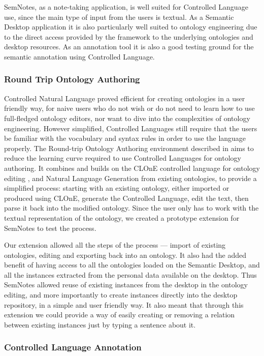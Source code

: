 SemNotes, as a note-taking application, is well suited for Controlled Language use, since the main type of input from the users is textual. As a Semantic Desktop application it is also particularly well suited to ontology engineering due to the direct access provided by the framework to the underlying ontologies and desktop resources. As an annotation tool it is also a good testing ground for the semantic annotation using Controlled Language.

\subsubsection{Round Trip Ontology Authoring}

Controlled Natural Language proved efficient for creating ontologies in a user friendly way, for naive users who do not wish or do not need to learn how to use full-fledged ontology editors, nor want to dive into the complexities of ontology engineering. However simplified, Controlled Languages still require that the users be familiar with the vocabulary and syntax rules in order to use the language properly. The Round-trip Ontology Authoring environment described in \cite{Davis2008} aims to reduce the learning curve required to use Controlled Languages for ontology authoring. It combines and builds on the CLOnE controlled language for ontology editing \cite{Funk2007}, and Natural Language Generation from existing ontologies, to provide a simplified process: starting with an existing ontology, either imported or produced using CLOnE, generate the Controlled Language, edit the text, then parse it back into the modified ontology. Since the user only has to work with the textual representation of the ontology, we created a prototype extension for SemNotes to test the process.

Our extension allowed all the steps of the process --- import of existing ontologies, editing and exporting back into an ontology. It also had the added benefit of having access to all the ontologies loaded on the Semantic Desktop, and all the instances extracted from the personal data available on the desktop. Thus SemNotes allowed reuse of existing instances from the desktop in the ontology editing, and more importantly to create instances directly into the desktop repository, in a simple and user friendly way. It also meant that through this extension we could provide a way of easily creating or removing a relation between existing instances just by typing a sentence about it. 

\subsubsection{Controlled Language Annotation}

